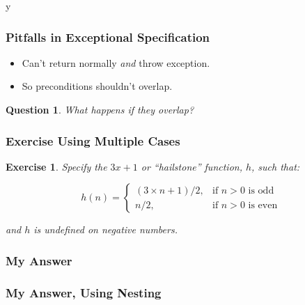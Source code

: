 \if y\MAKEHANDOUTS \documentclass[t,compress,landscape,handout]{beamer}
\newtheorem*{question}{Question}
\newtheorem*{exercise}{Exercise}
\begin{document}
\begin{frame}
\frametitle{Pitfalls in Exceptional Specification}
\begin{itemize}
\item
Can't return normally \emph{and\/} throw exception.

\item
So preconditions shouldn't overlap.
\end{itemize}

\begin{question}
What happens if they overlap?
\end{question}
\end{frame}

\begin{frame}
\frametitle{Exercise Using Multiple Cases}

\begin{exercise}
Specify the $3x+1$ or ``hailstone'' function, $h$,
such that:

\begin{displaymath}
h(n) = 
\left\{
\begin{array}{ll}
(3 \times n + 1)/2, & \mbox{if $n>0$ is odd} \\
n / 2,              & \mbox{if $n>0$ is even}
\end{array}
\right.
\end{displaymath}

and $h$ is undefined on negative numbers.
\end{exercise}
\end{frame}

\begin{frame}[fragile]
\frametitle{My Answer}

\end{frame}

\begin{frame}[fragile]
\frametitle{My Answer, Using Nesting}

\end{frame}


\end{document}

